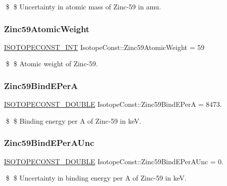 \$ \$ Uncertainty in atomic mass of Zinc-\/59 in amu. \mbox{\label{group___isotope_const-_zinc-_zn59_ga9700a77a2acf23f4171a0e6c1b88e93a}} 
\subsubsection{\texorpdfstring{Zinc59\+Atomic\+Weight}{Zinc59AtomicWeight}}
{\footnotesize\ttfamily \mbox{\hyperlink{group___isotope_const-_macros_ga5f18360b3e99483a35c32d789e62621c}{I\+S\+O\+T\+O\+P\+E\+C\+O\+N\+S\+T\+\_\+\+I\+NT}} Isotope\+Const\+::\+Zinc59\+Atomic\+Weight = 59}

\$ \$ Atomic weight of Zinc-\/59. \mbox{\label{group___isotope_const-_zinc-_zn59_ga38d9c72084aa6daacc4f3e2baf85eaf0}} 
\subsubsection{\texorpdfstring{Zinc59\+Bind\+E\+PerA}{Zinc59BindEPerA}}
{\footnotesize\ttfamily \mbox{\hyperlink{group___isotope_const-_macros_ga8f45a7272ce02c0b4c65c44636ed719a}{I\+S\+O\+T\+O\+P\+E\+C\+O\+N\+S\+T\+\_\+\+D\+O\+U\+B\+LE}} Isotope\+Const\+::\+Zinc59\+Bind\+E\+PerA = 8473.}

\$ \$ Binding energy per A of Zinc-\/59 in keV. \mbox{\label{group___isotope_const-_zinc-_zn59_ga96eb6eed891ff4e42e84388cea2dce76}} 
\subsubsection{\texorpdfstring{Zinc59\+Bind\+E\+Per\+A\+Unc}{Zinc59BindEPerAUnc}}
{\footnotesize\ttfamily \mbox{\hyperlink{group___isotope_const-_macros_ga8f45a7272ce02c0b4c65c44636ed719a}{I\+S\+O\+T\+O\+P\+E\+C\+O\+N\+S\+T\+\_\+\+D\+O\+U\+B\+LE}} Isotope\+Const\+::\+Zinc59\+Bind\+E\+Per\+A\+Unc = 0.}

\$ \$ Uncertainty in binding energy per A of Zinc-\/59 in keV. \mbox{\label{group___isotope_const-_zinc-_zn59_gaaef0dbf7d15c403c2e77ed966bca6046}} 
